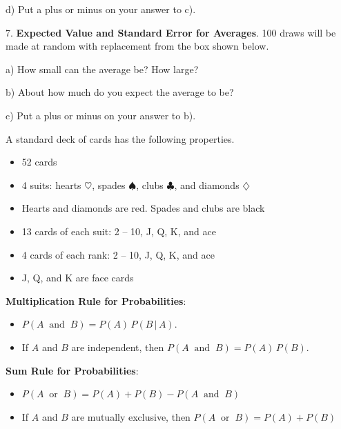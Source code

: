 \documentclass[10pt]{article}
\begin{document}
\hspace{10pt} d)  Put a plus or minus on your answer to c).
\vspace{.6in}


7. \textbf{Expected Value and Standard Error for Averages}. 
100 draws will be made at random with replacement
from the box shown below.\vspace{-20pt}
\begin{center}
\end{center}
\hspace{10pt} a)  How small can the average be?  How large?
\vspace{.5in}

\hspace{10pt} b) About how much do you expect the average to be?
\vspace{.6in}

\hspace{10pt} c)  Put a plus or minus on your answer to b).
\vspace{.6in}

\vfill
\eject

 A standard deck of cards has the following properties.
\begin{itemize}
\item 52 cards
\item 4 suits:  hearts $\heartsuit$, spades $\spadesuit$, clubs $\clubsuit$,
  and diamonds $\diamondsuit$
\item Hearts and diamonds are red.  Spades and clubs are black
\item 13 cards of each suit:  2 -- 10, J, Q, K, and ace
\item 4 cards of each rank:  2 -- 10, J, Q, K, and ace
\item J, Q, and K are face cards
\end{itemize}

\textbf{Multiplication Rule for Probabilities}:  
\begin{itemize}
\item $P(A\;\;\mbox{and}\;\;B)=P(A)\,P(B\,\vert\,A)$.
\item If $A$ and $B$ are independent, then $P(A\;\;\mbox{and}\;\;B)=P(A)\,P(B)$.
\end{itemize}
\textbf{Sum Rule for Probabilities}:
\begin{itemize}
\item $P(A\;\;\mbox{or}\;\;B)=P(A)+P(B) - P(A\;\;\mbox{and}\;\;B)$
\item If $A$ and $B$ are mutually exclusive, then $P(A\;\;\mbox{or}\;\;B)=P(A)+P(B)$
\end{itemize}  
\bigskip
\end{document}
